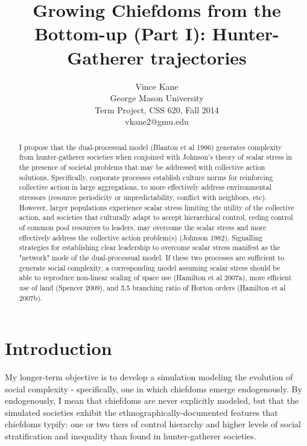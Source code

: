 \documentclass[11pt,oneside,a4paper,onecolumn]{article}
\begin{document}
\title{Growing Chiefdoms from the Bottom-up (Part I): Hunter-Gatherer trajectories}

\author{Vince Kane\\
George Mason University\\
Term Project, CSS 620, Fall 2014\\
vkane2@gmu.edu}

\maketitle

\begin{abstract}
I propose that the dual-processual model (Blanton et al 1996) generates complexity from hunter-gatherer societies when conjoined with Johnson's theory of scalar stress in the presence of societal problems that may be addressed with collective action solutions.
Specifically, corporate processes establish culture norms for reinforcing collective action in large aggregations, to more effectively address environmental stressors (resource periodicity or unpredictability, conflict with neighbors, etc).
However, larger populations experience scalar stress limiting the utility of the collective action, and societies that culturally adapt to accept hierarchical control, ceding control of common pool resources to leaders, may overcome the scalar stress and more effectively address the collective action problem(s) (Johnson 1982).  
Signalling strategies for establishing clear leadership to overcome scalar stress manifest as the "network" mode of the dual-processual model.
If these two processes are sufficient to generate social complexity, a corresponding model assuming scalar stress should be able to reproduce non-linear scaling of space use (Hamilton et al 2007a), more efficient use of land (Spencer 2009), and \~3.5 branching ratio of Horton orders (Hamilton et al 2007b).
\end{abstract}

\section{Introduction}
My longer-term objective is to develop a simulation modeling the evolution of social complexity - specifically, one in which chiefdoms emerge endogenously.  By endogenously, I mean that chiefdoms are never explicitly modeled, but that the simulated societies exhibit the ethnographically-documented features that chiefdoms typify: one or two tiers of control hierarchy and higher levels of social stratification and inequality than found in hunter-gatherer societies.
\end{document}
